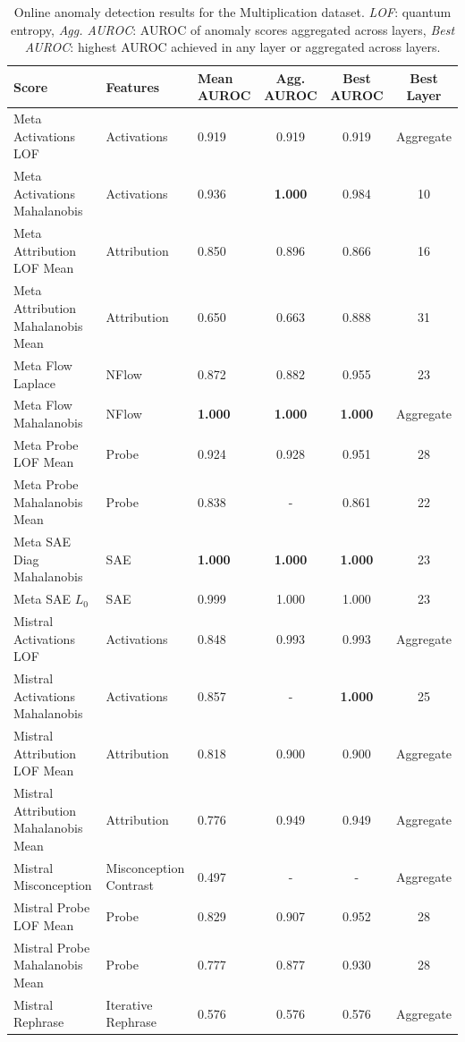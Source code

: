 \begin{table}[H]
\centering
\scriptsize  %
\renewcommand{\arraystretch}{1.2}  %
\setlength{\tabcolsep}{2pt}  %
\begin{tabular}{lp{3cm}lccc}
\toprule
\textbf{Score} & \textbf{Features} & \textbf{Mean AUROC} & \textbf{Agg. AUROC} & \textbf{Best AUROC} & \textbf{Best Layer} \\
\midrule
Meta Activations LOF                 & Activations & 0.919  & 0.919  & 0.919  & Aggregate \\ 
Meta Activations Mahalanobis         & Activations & 0.936  & \textbf{1.000}  & 0.984  & 10 \\ 
Meta Attribution LOF Mean            & Attribution & 0.850  & 0.896  & 0.866  & 16 \\ 
Meta Attribution Mahalanobis Mean    & Attribution & 0.650  & 0.663  & 0.888  & 31 \\ 
Meta Flow Laplace                    & NFlow      & 0.872  & 0.882  & 0.955  & 23 \\ 
Meta Flow Mahalanobis                & NFlow      & \textbf{1.000}  & \textbf{1.000}  & \textbf{1.000}  & Aggregate \\ 
Meta Probe LOF Mean                  & Probe      & 0.924  & 0.928  & 0.951  & 28 \\ 
Meta Probe Mahalanobis Mean          & Probe      & 0.838  & -      & 0.861  & 22 \\ 
Meta SAE Diag Mahalanobis            & SAE        & \textbf{1.000}  & \textbf{1.000}  & \textbf{1.000}  & 23 \\ 
Meta SAE $L_0$                          & SAE        & 0.999  & 1.000  & 1.000  & 23 \\ 
Mistral Activations LOF              & Activations & 0.848  & 0.993  & 0.993  & Aggregate \\ 
Mistral Activations Mahalanobis      & Activations & 0.857  & -      & \textbf{1.000}  & 25 \\ 
Mistral Attribution LOF Mean         & Attribution & 0.818  & 0.900  & 0.900  & Aggregate \\ 
Mistral Attribution Mahalanobis Mean & Attribution & 0.776  & 0.949  & 0.949  & Aggregate \\ 
Mistral Misconception                & Misconception Contrast & 0.497  & -      & -  & Aggregate \\ 
Mistral Probe LOF Mean               & Probe      & 0.829  & 0.907  & 0.952  & 28 \\ 
Mistral Probe Mahalanobis Mean       & Probe      & 0.777  & 0.877  & 0.930  & 28 \\ 
Mistral Rephrase                     & Iterative Rephrase & 0.576  & 0.576  & 0.576  & Aggregate \\ 
\bottomrule
\end{tabular}
\caption{Online anomaly detection results for the Multiplication dataset. \emph{LOF}: quantum entropy, \emph{Agg. AUROC}: AUROC of anomaly scores aggregated across layers, \emph{Best AUROC}: highest AUROC achieved in any layer or aggregated across layers.}
\label{tab:online_anomaly_multiplication}
\end{table}



